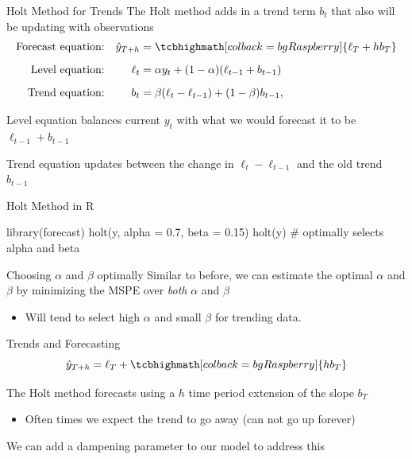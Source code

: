 \documentclass[aspectratio=169,t,11pt,table]{beamer}
\begin{document}
\begin{frame}{Holt Method for Trends}
  The Holt method adds in a trend term $b_t$ that also will be updating with observations
  \begin{align*}
    \text{Forecast equation:} && \hat{y}_{T+h} &= \tcbhighmath[colback = bgRaspberry]{\ell_{T} + hb_{T}} \\[2mm]
    \text{Level equation:}    && \ell_{t} &= \alpha y_{t} + (1 - \alpha)(\ell_{t-1} + b_{t-1}) \\[2mm]
    \text{Trend equation:}    && b_{t}    &= \beta(\ell_{t} - \ell_{t-1}) + (1 -\beta)b_{t-1},
  \end{align*}

  \bigskip 
  Level equation balances current $y_t$ with what we would forecast it to be $\ell_{t-1} + b_{t-1}$

  \bigskip
  Trend equation updates between the change in $\ell_t - \ell_{t-1}$ and the old trend $b_{t-1}$
\end{frame}


\begin{frame}[fragile]{Holt Method  in R}
  \vspace*{-\bigskipamount}
  \begin{codeblock}
library(forecast)
holt(y, alpha = 0.7, beta = 0.15)
holt(y) # optimally selects alpha and beta
  \end{codeblock}
\end{frame}

\begin{frame}{Choosing $\alpha$ and $\beta$ optimally}
  Similar to before, we can estimate the optimal $\alpha$ and $\beta$ by minimizing the MSPE over \emph{both} $\alpha$ and $\beta$

  \begin{itemize}
    \item Will tend to select high $\alpha$ and small $\beta$ for trending data. 
  \end{itemize}
\end{frame}

\begin{frame}{Trends and Forecasting}
  \vspace*{-\bigskipamount}
  $$
    \hat{y}_{T+h} = \ell_{T} + \tcbhighmath[colback = bgRaspberry]{h b_{T}}
  $$
  
  The Holt method forecasts using a $h$ time period extension of the slope $b_T$
  \begin{itemize}
    \item Often times we expect the trend to go away (can not go up forever)
  \end{itemize}

  \bigskip
  We can add a \alert{dampening} parameter to our model to address this
\end{frame}
\end{document}
